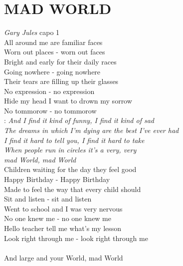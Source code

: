 \section*{\Huge MAD WORLD}
\emph{Gary Jules} \hspace{11cm} capo 1\\

All around me are familiar faces\\
Worn out places - worn out faces\\
Bright and early for their daily races\\
Going nowhere - going nowhere\\
Their tears are filling up their glasses\\
No expression - no expression\\
Hide my head I want to drown my sorrow\\
No tommorow - no tommorow\\

\textregistered: \emph{And I find it kind of funny, I find it kind of sad\\
The dreams in which I'm dying are the best I've ever had\\
I find it hard to tell you, I find it hard to take\\
When people run in circles it's a very, very\\
mad World, mad World}\\

Children waiting for the day they feel good\\
Happy Birthday - Happy Birthday\\
Made to feel the way that every child should\\
Sit and listen - sit and listen\\
Went to school and I was very nervous\\
No one knew me - no one knew me\\
Hello teacher tell me what's my lesson\\
Look right through me - look right through me\\

\textregistered\\
And large and your World, mad World

\newpage
